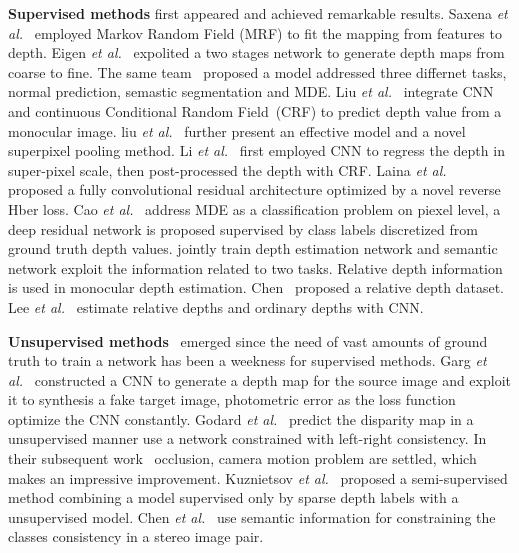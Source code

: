 \documentclass{svjour3}                     %
\begin{document}
\textbf{Supervised methods} first appeared and achieved remarkable results. Saxena \emph{et al.}~\cite{saxena2006learning} employed Markov Random Field (MRF) to fit the mapping from features to depth. Eigen \emph{et al.}~\cite{eigen2014depth} expolited a two stages network to
generate depth maps from coarse to fine. The same team~\cite{7410661} proposed a model addressed three differnet tasks, normal prediction, semastic segmentation and MDE. Liu \textit{et al.}~\cite{liu2015deep} integrate CNN and continuous Conditional Random Field~(CRF) to predict depth value from a monocular image. 
liu \emph{et al.}~\cite{liu2015learning} further present an effective model and a novel superpixel pooling method. Li \emph{et al.}~\cite{li2015depth} first employed CNN to regress the depth in super-pixel scale, then post-processed the depth with CRF. Laina \emph{et al.}~\cite{laina2016deeper} proposed a fully convolutional residual architecture optimized by a novel reverse Hber loss. Cao \emph{et al.}~\cite{cao2017estimating} address MDE as a classification problem on piexel level, a deep residual network is proposed supervised by class labels discretized from ground truth depth values. \cite{2015semantic,2016semantic}  jointly train depth estimation network and semantic network exploit the information related to two tasks. Relative depth information is used in monocular depth estimation. Chen~\cite{NIPS2016_0deb1c54} proposed a relative depth dataset. Lee \textit{et al.}~\cite{lee2019monocular} estimate relative depths and ordinary depths with CNN.

\textbf{Unsupervised methods}~\cite{godard2017unsupervised,Godard_2019_ICCV,zhou2017unsupervised} emerged since the need of vast amounts of ground truth to train a network has been a weekness for supervised methods. Garg \emph{et al.}~\cite{garg2016unsupervised} constructed a CNN to generate a depth map for the source image and exploit it to synthesis a fake target image, photometric error as the loss function optimize the CNN constantly. Godard \textit{et al.}~\cite{godard2017unsupervised} predict the disparity map in a unsupervised manner use a network constrained with left-right consistency. In their subsequent work~\cite{Godard_2019_ICCV} occlusion, camera motion problem are settled, which makes an impressive improvement. Kuznietsov \textit{et al.}~\cite{Kuznietsov2017} proposed a semi-supervised method combining a model supervised only by sparse depth labels with a unsupervised model. Chen \emph{et al.}~\cite{2019semantic} use semantic information for constraining the classes consistency in a stereo image pair.
\end{document}
